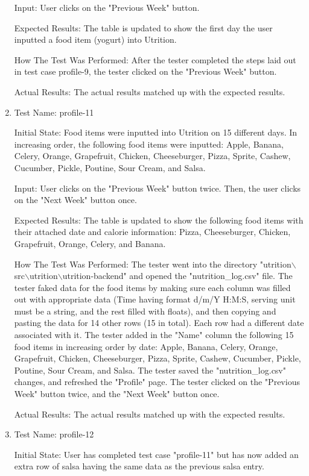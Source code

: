 \documentclass[12pt, titlepage]{article}
\begin{document}
\begin{enumerate}
		Input: User clicks on the "Previous Week" button.
		
		Expected Results: The table is updated to show the first day the user inputted a food item (yogurt) into Utrition.
		
		How The Test Was Performed: After the tester completed the steps laid out in test case profile-9, the tester clicked on the "Previous Week" button.
		
		Actual Results: The actual results matched up with the expected results.
		
		\item{Test Name: profile-11}
		
		Initial State: Food items were inputted into Utrition on 15 different days. In increasing order, the following food items were inputted: Apple, Banana, Celery, Orange, Grapefruit, Chicken, Cheeseburger, Pizza, Sprite, Cashew, Cucumber, Pickle, Poutine, Sour Cream, and Salsa.
		
		Input: User clicks on the "Previous Week" button twice. Then, the user clicks on the "Next Week" button once.
		
		Expected Results: The table is updated to show the following food items with their attached date and calorie information: Pizza, Cheeseburger, Chicken, Grapefruit, Orange, Celery, and Banana.
		
		How The Test Was Performed: The tester went into the directory "utrition$\backslash$src$\backslash$utrition$\backslash$utrition-backend" and opened the "nutrition\_log.csv" file. The tester faked data for the food items by making sure each column was filled out with appropriate data (Time having format d/m/Y H:M:S, serving unit must be a string, and the rest filled with floats), and then copying and pasting the data for 14 other rows (15 in total). Each row had a different date associated with it. The tester added in the "Name" column the following 15 food items in increasing order by date: Apple, Banana, Celery, Orange, Grapefruit, Chicken, Cheeseburger, Pizza, Sprite, Cashew, Cucumber, Pickle, Poutine, Sour Cream, and Salsa. The tester saved the "nutrition\_log.csv" changes, and refreshed the "Profile" page. The tester clicked on the "Previous Week" button twice, and the "Next Week" button once.
		
		Actual Results: The actual results matched up with the expected results.
		
		\item{Test Name: profile-12}
		
		Initial State:  User has completed test case "profile-11" but has now added an extra row of salsa having the same data as the previous salsa entry.
		

\end{enumerate}
\end{document}
